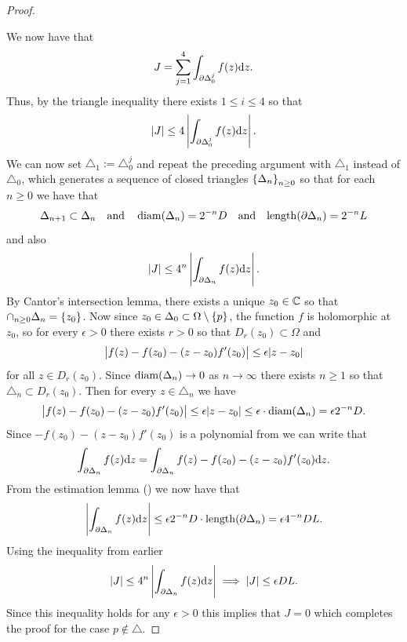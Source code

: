 \documentclass[11pt,a4paper]{article}
\begin{document}
\begin{proof}
\begin{center}
  \end{center}
  We now have that
  \[
    J = \sum_{j=1}^{4} \int_{\partial \Delta_0^j} f(z) \mathrm{d} z.
  \]
  Thus, by the triangle inequality there exists $1 \le i \le 4$ so that
  \[
    \left\lvert J\right\rvert \le 4 \left\lvert\int_{\partial \Delta_0^j} f(z) \mathrm{d} z\right\rvert.
  \]
  We can now set $\triangle_1 := \triangle_0^j$ and repeat the preceding
  argument with $\triangle_1$ instead of $\triangle_0$, which generates
  a sequence of closed triangles $\left\{\Delta_n\right\}_{n \geq 0}$ so that
  for each $n \geq 0$ we have that
  \[
    \Delta_{n+1} \subset \Delta_{n} \quad \text{and} \quad
    \operatorname{diam}(\Delta_n) = 2^{-n} D \quad \text{and} \quad
    \mathrm{length}(\partial \Delta_n) = 2^{-n} L
  \]
  and also
  \[
    \left\lvert J\right\rvert \le 4^n \left\lvert\int_{\partial \Delta_n} f(z) \mathrm{d} z\right\rvert.
  \]
  By Cantor's intersection lemma, there exists a unique $z_0 \in \mathbb{C}$ so
  that $\cap_{n \geq 0} \Delta_n = \left\{z_0\right\}$.
  Now since $z_0 \in \Delta_0 \subset \Omega \setminus \left\{p\right\}$,
  the function $f$ is holomorphic at $z_0$,
  so for every $\epsilon > 0$ there exists $r > 0$ so that
  $D_r(z_0) \subset \Omega$ and
  \[
    \left\lvert f(z) - f(z_0) - (z - z_0) f'(z_0)\right\rvert \le
    \epsilon |z - z_0|
  \]
  for all $z \in D_r(z_0)$.
  Since $\operatorname{diam}(\Delta_n) \to 0$ as $n \to \infty$ there exists
  $n \geq 1$ so that $\triangle_n \subset D_r(z_0)$.
  Then for every $z \in \triangle_n$ we have
  \[
    \left\lvert f(z) - f(z_0) - (z - z_0) f'(z_0)\right\rvert \le
    \epsilon |z - z_0| \le
    \epsilon \cdot \operatorname{diam}(\Delta_n) = \epsilon 2^{-n} D.
  \]
  Since $- f(z_0) - (z - z_0) f'(z_0)$ is a polynomial from
   we can write that
  \[
    \int_{\partial \Delta_n} f(z) \mathrm{d} z =
    \int_{\partial \Delta_n} f(z) - f(z_0) - (z - z_0) f'(z_0) \mathrm{d} z.
  \]
  From the estimation lemma () we now have
  that
  \[
    \left\lvert\int_{\partial \Delta_n} f(z) \mathrm{d} z\right\rvert \le
    \epsilon 2^{-n} D \cdot \mathrm{length}(\partial \Delta_n) =
    \epsilon 4^{-n} D L.
  \]
  Using the inequality from earlier
  \[
    \left\lvert J\right\rvert \le 4^n \left\lvert\int_{\partial \Delta_n} f(z) \mathrm{d} z\right\rvert \implies
    \left\lvert J\right\rvert \le \epsilon D L.
  \]
  Since this inequality holds for any $\epsilon > 0$ this implies
  that $J = 0$ which completes the proof for the case $p \notin \triangle$.


\end{proof}
\end{document}

